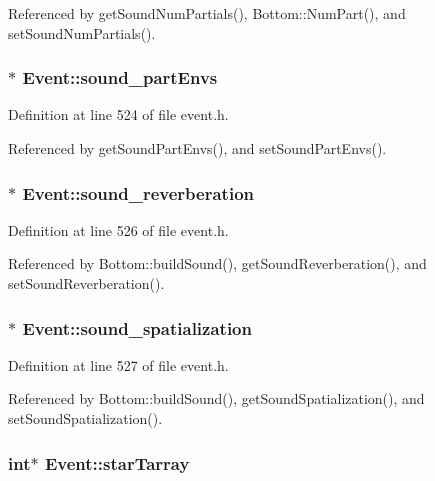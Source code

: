 Referenced by get\-Sound\-Num\-Partials(), Bottom::Num\-Part(), and set\-Sound\-Num\-Partials().
\subsubsection{$\ast$ {\bf Event::sound\_\-part\-Envs}\hspace{0.3cm}{\tt  [protected]}}\label{classEvent_p4}




Definition at line 524 of file event.h.

Referenced by get\-Sound\-Part\-Envs(), and set\-Sound\-Part\-Envs().
\subsubsection{$\ast$ {\bf Event::sound\_\-reverberation}\hspace{0.3cm}{\tt  [protected]}}\label{classEvent_p6}




Definition at line 526 of file event.h.

Referenced by Bottom::build\-Sound(), get\-Sound\-Reverberation(), and set\-Sound\-Reverberation().
\subsubsection{$\ast$ {\bf Event::sound\_\-spatialization}\hspace{0.3cm}{\tt  [protected]}}\label{classEvent_p7}




Definition at line 527 of file event.h.

Referenced by Bottom::build\-Sound(), get\-Sound\-Spatialization(), and set\-Sound\-Spatialization().
\subsubsection{\setlength{\rightskip}{0pt plus 5cm}int$\ast$ {\bf Event::star\-Tarray}}\label{classEvent_o28}




